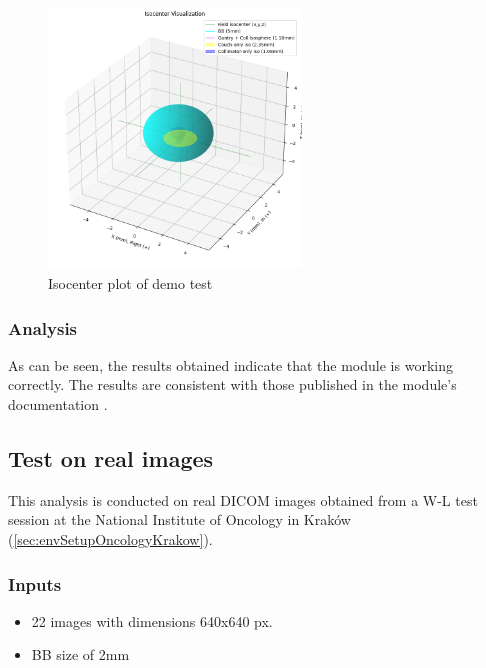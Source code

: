 \begin{figure}[H]
    \centering
    \includegraphics[width=0.6\textwidth]{Content/Images/analysis_wl_demo_isocenter_plot.png}
    \caption{Isocenter plot of demo test}
\end{figure}

\subsubsection{Analysis}

As can be seen, the results obtained indicate that the module is working correctly. The results are consistent with those published in the module's documentation \cite{pylinac_wl_demo}. 

\subsection{Test on real images} \label{sec:analysisEvaluationWLRealImagesOncology}

This analysis is conducted on real DICOM images obtained from a W-L test session at the National Institute of Oncology in Kraków (\autoref{sec:envSetupOncologyKrakow}).

\subsubsection{Inputs}

\begin{itemize}
    \item 22 images with dimensions 640x640 px.
    \item BB size of 2mm
\end{itemize}

